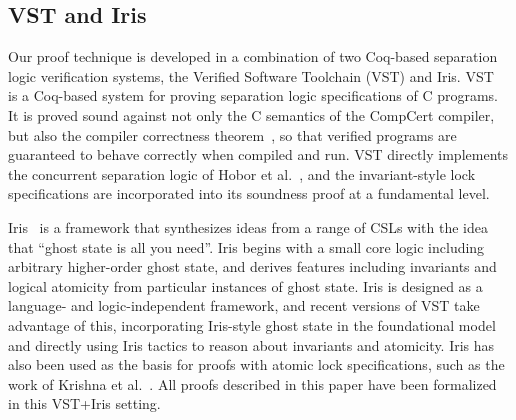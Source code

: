 \documentclass[runningheads]{llncs}
\begin{document}
\subsection{VST and Iris}

Our proof technique is developed in a combination of two Coq-based separation logic verification systems, the Verified Software Toolchain (VST) and Iris. VST~\cite{plfcc} is a Coq-based system for proving separation logic specifications of C programs. It is proved sound against not only the C semantics of the CompCert compiler, but also the compiler correctness theorem~\cite{cpm}, so that verified programs are guaranteed to behave correctly when compiled and run. VST directly implements the concurrent separation logic of Hobor et al.~\cite{oraclesematic}, and the invariant-style lock specifications are incorporated into its soundness proof at a fundamental level.

Iris~\cite{iris} is a framework that synthesizes ideas from a range of CSLs with the idea that ``ghost state is all you need''. Iris begins with a small core logic including arbitrary higher-order ghost state, and derives features including invariants and logical atomicity from particular instances of ghost state. Iris is designed as a language- and logic-independent framework, and recent versions of VST take advantage of this, incorporating Iris-style ghost state in the foundational model and directly using Iris tactics to reason about invariants and atomicity. Iris has also been used as the basis for proofs with atomic lock specifications, such as the work of Krishna et al.~\cite{templates}. All proofs described in this paper have been formalized in this VST+Iris setting.
\end{document}
